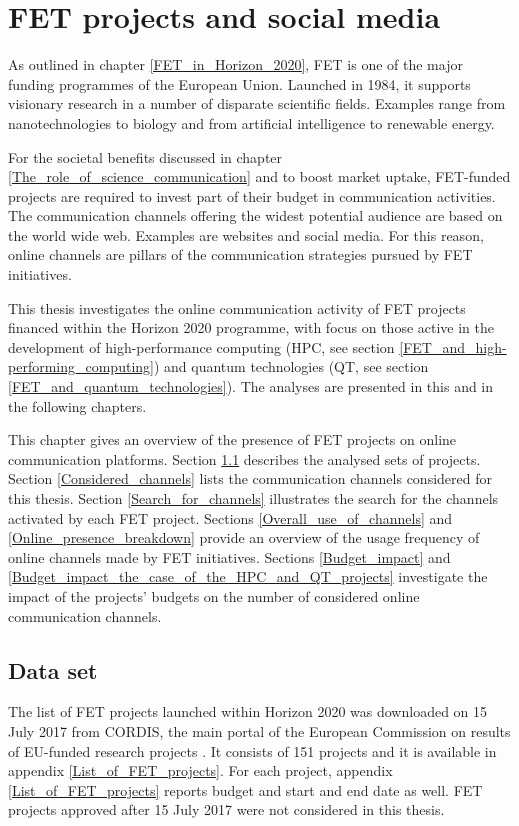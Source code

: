 \chapter{FET projects and social media} \label{FET_projects_and_social_media}
As outlined in chapter \ref{FET_in_Horizon_2020}, FET is one of the major funding programmes of the European Union. Launched in 1984, it supports visionary research in a number of disparate scientific fields. Examples range from nanotechnologies to biology and from artificial intelligence to renewable energy.

For the societal benefits discussed in chapter \ref{The_role_of_science_communication} and to boost market uptake, FET-funded projects are required to invest part of their budget in communication activities. The communication channels offering the widest potential audience are based on the world wide web. Examples are websites and social media. For this reason, online channels are pillars of the communication strategies pursued by FET initiatives. 

This thesis investigates the online communication activity of FET projects financed within the Horizon 2020 programme, with focus on those active in the development of high-performance computing (HPC, see section \ref{FET_and_high-performing_computing}) and quantum technologies (QT, see section \ref{FET_and_quantum_technologies}). The analyses are presented in this and in the following chapters.

This chapter gives an overview of the presence of FET projects on online communication platforms. Section \ref{Data_set} describes the analysed sets of projects. Section \ref{Considered_channels} lists the communication channels considered for this thesis. Section \ref{Search_for_channels} illustrates the search for the channels activated by each FET project. Sections \ref{Overall_use_of_channels} and \ref{Online_presence_breakdown} provide an overview of the usage frequency of online channels made by FET initiatives. Sections \ref{Budget_impact} and \ref{Budget_impact_the_case_of_the_HPC_and_QT_projects} investigate the impact of the projects' budgets on the number of considered online communication channels.

\section{Data set} \label{Data_set}
The list of FET projects launched within Horizon 2020 was downloaded on 15 July 2017 from CORDIS, the main portal of the European Commission on results of EU-funded research projects \cite{CORDIS}. It consists of 151 projects and it is available in appendix \ref{List_of_FET_projects}. For each project, appendix \ref{List_of_FET_projects} reports budget and start and end date as well. FET projects approved after 15 July 2017 were not considered in this thesis.

